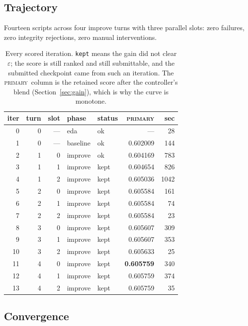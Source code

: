 \documentclass[11pt,a4paper]{article}
\newcommand{\code}[1]{\texttt{#1}}
\newcommand{\primary}{\textsc{primary}}
\begin{document}
\subsection{Trajectory}

Fourteen scripts across four improve turns with three parallel slots: zero failures, zero
integrity rejections, zero manual interventions.

\begin{table}[htbp]
\centering
\small
\begin{tabular}{@{}rrrllrr@{}}
\toprule
\textbf{iter} & \textbf{turn} & \textbf{slot} & \textbf{phase} & \textbf{status} &
\textbf{\primary} & \textbf{sec} \\
\midrule
 0 & 0 & --- & eda      & ok    & ---      &   28 \\
 1 & 0 & --- & baseline & ok    & 0.602009 &  144 \\
\midrule
 2 & 1 & 0 & improve & ok   & 0.604169 &  783 \\
 3 & 1 & 1 & improve & kept & 0.604654 &  826 \\
 4 & 1 & 2 & improve & kept & 0.605036 & 1042 \\
\midrule
 5 & 2 & 0 & improve & kept & 0.605584 &  161 \\
 6 & 2 & 1 & improve & kept & 0.605584 &   74 \\
 7 & 2 & 2 & improve & kept & 0.605584 &   23 \\
\midrule
 8 & 3 & 0 & improve & kept & 0.605607 &  309 \\
 9 & 3 & 1 & improve & kept & 0.605607 &  353 \\
10 & 3 & 2 & improve & kept & 0.605633 &   25 \\
\midrule
11 & 4 & 0 & improve & kept & \textbf{0.605759} &  340 \\
12 & 4 & 1 & improve & kept & 0.605759 &  374 \\
13 & 4 & 2 & improve & kept & 0.605759 &   35 \\
\bottomrule
\end{tabular}
\caption{Every scored iteration. \code{kept} means the gain did not clear $\varepsilon$; the
score is still ranked and still submittable, and the submitted checkpoint came from such an
iteration. The \primary\ column is the retained score after the controller's blend
(Section~\ref{sec:gain}), which is why the curve is monotone.}
\label{tab:trajectory}
\end{table}

\subsection{Convergence}
\end{document}
